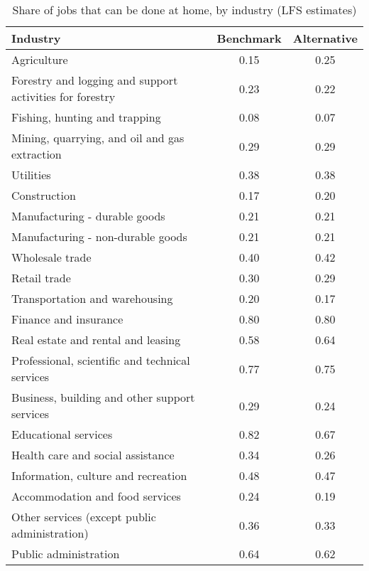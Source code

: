 \begin{table}[ht]
\centering
\caption{Share of jobs that can be done at home, by industry (LFS estimates)} 
\label{tab:industry_lfs}
\begin{tabular}{lcc}
  \hline
Industry & Benchmark & Alternative \\ 
  \hline
Agriculture & 0.15 & 0.25 \\ 
  Forestry and logging and support activities for forestry & 0.23 & 0.22 \\ 
  Fishing, hunting and trapping & 0.08 & 0.07 \\ 
  Mining, quarrying, and oil and gas extraction & 0.29 & 0.29 \\ 
  Utilities & 0.38 & 0.38 \\ 
  Construction & 0.17 & 0.20 \\ 
  Manufacturing - durable goods & 0.21 & 0.21 \\ 
  Manufacturing - non-durable goods & 0.21 & 0.21 \\ 
  Wholesale trade & 0.40 & 0.42 \\ 
  Retail trade & 0.30 & 0.29 \\ 
  Transportation and warehousing & 0.20 & 0.17 \\ 
  Finance and insurance & 0.80 & 0.80 \\ 
  Real estate and rental and leasing & 0.58 & 0.64 \\ 
  Professional, scientific and technical services & 0.77 & 0.75 \\ 
  Business, building and other support services & 0.29 & 0.24 \\ 
  Educational services & 0.82 & 0.67 \\ 
  Health care and social assistance & 0.34 & 0.26 \\ 
  Information, culture and recreation & 0.48 & 0.47 \\ 
  Accommodation and food services & 0.24 & 0.19 \\ 
  Other services (except public administration) & 0.36 & 0.33 \\ 
  Public administration & 0.64 & 0.62 \\ 
   \hline
\end{tabular}
\end{table}
